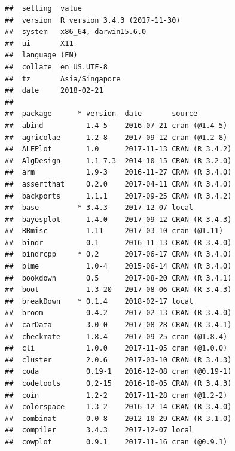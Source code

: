 \documentclass[]{book}
\theoremstyle{definition}
\theoremstyle{definition}
\theoremstyle{definition}
\theoremstyle{remark}
\begin{document}
\begin{verbatim}
##  setting  value                       
##  version  R version 3.4.3 (2017-11-30)
##  system   x86_64, darwin15.6.0        
##  ui       X11                         
##  language (EN)                        
##  collate  en_US.UTF-8                 
##  tz       Asia/Singapore              
##  date     2018-02-21                  
## 
##  package      * version  date       source                                
##  abind          1.4-5    2016-07-21 cran (@1.4-5)                         
##  agricolae      1.2-8    2017-09-12 cran (@1.2-8)                         
##  ALEPlot        1.0      2017-11-13 CRAN (R 3.4.2)                        
##  AlgDesign      1.1-7.3  2014-10-15 CRAN (R 3.2.0)                        
##  arm            1.9-3    2016-11-27 CRAN (R 3.4.0)                        
##  assertthat     0.2.0    2017-04-11 CRAN (R 3.4.0)                        
##  backports      1.1.1    2017-09-25 CRAN (R 3.4.2)                        
##  base         * 3.4.3    2017-12-07 local                                 
##  bayesplot      1.4.0    2017-09-12 CRAN (R 3.4.3)                        
##  BBmisc         1.11     2017-03-10 cran (@1.11)                          
##  bindr          0.1      2016-11-13 CRAN (R 3.4.0)                        
##  bindrcpp     * 0.2      2017-06-17 CRAN (R 3.4.0)                        
##  blme           1.0-4    2015-06-14 CRAN (R 3.4.0)                        
##  bookdown       0.5      2017-08-20 CRAN (R 3.4.1)                        
##  boot           1.3-20   2017-08-06 CRAN (R 3.4.3)                        
##  breakDown    * 0.1.4    2018-02-17 local                                 
##  broom          0.4.2    2017-02-13 CRAN (R 3.4.0)                        
##  carData        3.0-0    2017-08-28 CRAN (R 3.4.1)                        
##  checkmate      1.8.4    2017-09-25 cran (@1.8.4)                         
##  cli            1.0.0    2017-11-05 cran (@1.0.0)                         
##  cluster        2.0.6    2017-03-10 CRAN (R 3.4.3)                        
##  coda           0.19-1   2016-12-08 cran (@0.19-1)                        
##  codetools      0.2-15   2016-10-05 CRAN (R 3.4.3)                        
##  coin           1.2-2    2017-11-28 cran (@1.2-2)                         
##  colorspace     1.3-2    2016-12-14 CRAN (R 3.4.0)                        
##  combinat       0.0-8    2012-10-29 CRAN (R 3.1.0)                        
##  compiler       3.4.3    2017-12-07 local                                 
##  cowplot        0.9.1    2017-11-16 cran (@0.9.1)                         

\end{verbatim}
\end{document}

